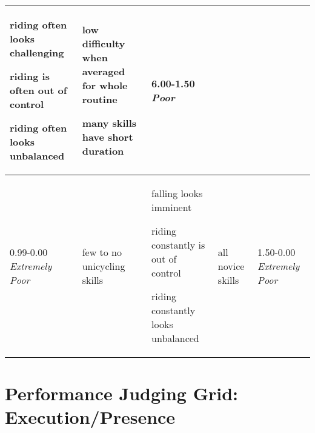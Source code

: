 \begin{minipage}{\textwidth}
\begin{longtable}{|p{1.5cm}|p{5cm}|p{5cm}|p{5cm}|p{1.5cm}|}
\begin{judging_items}%
\item riding often looks challenging
\item riding is often out of control
\item riding often looks unbalanced
\end{judging_items} &

\begin{judging_items}%
\item low difficulty when averaged for whole routine
\item many skills have short duration
\end{judging_items} &

6.00-1.50 \newline
\emph{Poor} \\
\hline

0.99-0.00 \newline
\emph{Extremely Poor} &

\begin{judging_items}%
\item few to no unicycling skills
\end{judging_items} &

\begin{judging_items}%
\item falling looks imminent
\item riding constantly is out of control
\item riding constantly looks unbalanced
\end{judging_items} &

\begin{judging_items}%
\item all novice skills
\end{judging_items} &

1.50-0.00 \newline
\emph{Extremely Poor} \\
\hline

\end{longtable}
\endgroup
\end{minipage}

\newpage
\section{Performance Judging Grid: Execution/Presence}

\begingroup
    \fontsize{7pt}{9pt}\selectfont
\setlength{\LTleft}{-2.5cm}

